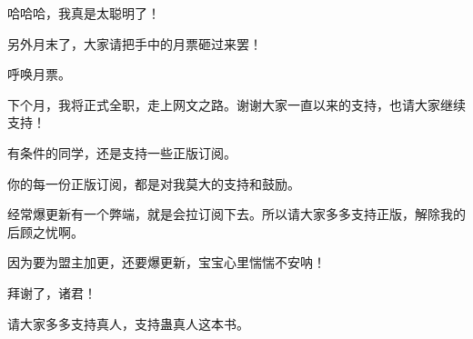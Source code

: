 \begin{this_body}
哈哈哈，我真是太聪明了！

另外月末了，大家请把手中的月票砸过来罢！

呼唤月票。

下个月，我将正式全职，走上网文之路。谢谢大家一直以来的支持，也请大家继续支持！

有条件的同学，还是支持一些正版订阅。

你的每一份正版订阅，都是对我莫大的支持和鼓励。

经常爆更新有一个弊端，就是会拉订阅下去。所以请大家多多支持正版，解除我的后顾之忧啊。

因为要为盟主加更，还要爆更新，宝宝心里惴惴不安呐！

拜谢了，诸君！

请大家多多支持真人，支持蛊真人这本书。

\end{this_body}

